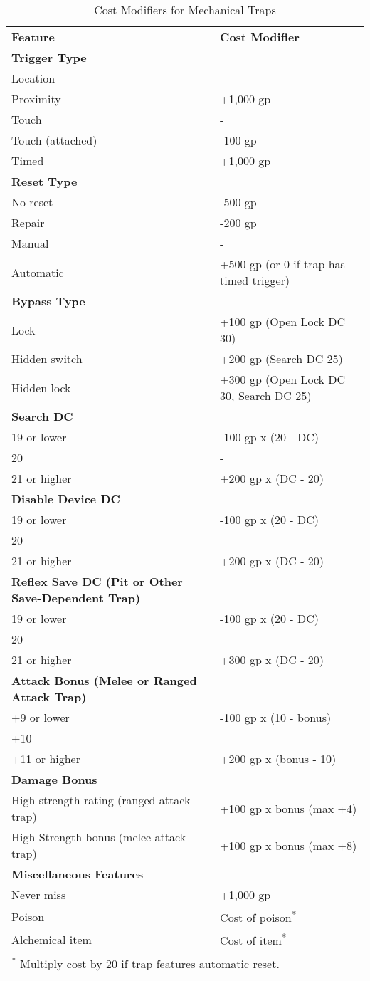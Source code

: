 \begin{table}[htb]
\caption{Cost Modifiers for Mechanical Traps}
\centering
\begin{tabular}{l l}
\textbf{Feature} & \textbf{Cost Modifier}\\
\textbf{Trigger Type}&\\
Location &-\\
Proximity &+1,000 gp\\
Touch &-\\
Touch (attached) &-100 gp\\
Timed &+1,000 gp\\
\textbf{Reset Type}&\\
No reset &-500 gp\\
Repair &-200 gp\\
Manual &-\\
Automatic &+500 gp (or 0 if trap has timed trigger)\\
\textbf{Bypass Type}&\\
Lock &+100 gp (Open Lock DC 30)\\
Hidden switch &+200 gp (Search DC 25)\\
Hidden lock &+300 gp (Open Lock DC 30, Search DC 25)\\
\textbf{Search DC}&\\
19 or lower &-100 gp x (20 - DC)\\
20 &-\\
21 or higher &+200 gp x (DC - 20)\\
\textbf{Disable Device DC}&\\
19 or lower &-100 gp x (20 - DC)\\
20 &-\\
21 or higher &+200 gp x (DC - 20)\\
\textbf{Reflex Save DC (Pit or Other Save-Dependent Trap)}&\\
19 or lower &-100 gp x (20 - DC)\\
20 &-\\
21 or higher &+300 gp x (DC - 20)\\
\textbf{Attack Bonus (Melee or Ranged Attack Trap)}&\\
+9 or lower &-100 gp x (10 - bonus)\\
+10 &-\\
+11 or higher &+200 gp x (bonus - 10)\\
\textbf{Damage Bonus}&\\
High strength rating (ranged attack trap) &+100 gp x bonus (max +4)\\
High Strength bonus (melee attack trap) &+100 gp x bonus (max +8)\\
\textbf{Miscellaneous Features}&\\
Never miss &+1,000 gp\\
Poison &Cost of poison\textsuperscript{*}\\
Alchemical item &Cost of item\textsuperscript{*}\\
\multicolumn{2}{l}{\textsuperscript{*} Multiply cost by 20 if trap features automatic reset.}\\
\end{tabular}
\end{table}

\clearpage
